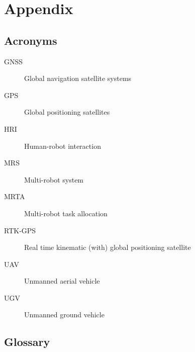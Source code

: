 

    \chapter{Appendix}

 

    \section{Acronyms}

    \begin{description}
        \item[GNSS] Global navigation satellite systems
        \item[GPS] Global positioning satellites
        \item[HRI] Human-robot interaction
        \item[MRS] Multi-robot system
        \item[MRTA] Multi-robot task allocation
        \item[RTK-GPS] Real time kinematic (with) global positioning satellite
        \item[UAV] Unmanned aerial vehicle
        \item[UGV] Unmanned ground vehicle
    \end{description}
    
    \section{Glossary}
    
